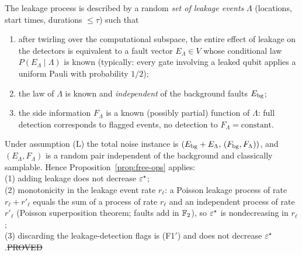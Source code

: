 \begin{definition}\label{def:L}
The leakage process is described by a random \emph{set of leakage events} $\Lambda$ (locations, start times, durations $\le\tau$) such that
\begin{enumerate}[(L1)]
\item after twirling over the computational subspace, the entire effect of leakage on the detectors is equivalent to a fault vector $E_\Lambda\in V$ whose conditional law
$P(E_\Lambda\mid\Lambda)$ is known (typically: every gate involving a leaked qubit applies a uniform Pauli with probability $1/2$);
\item the law of $\Lambda$ is known and \emph{independent} of the background faults $E_{\rm bg}$;
\item the side information $F_\Lambda$ is a known (possibly partial) function of $\Lambda$: full detection corresponds to flagged events, no detection to $F_\Lambda=\text{constant}$.
\end{enumerate}
\end{definition}

\begin{proposition}\label{prop:leak}
Under assumption (L) the total noise instance is $(E_{\rm bg}+E_\Lambda,\,(F_{\rm bg},F_\Lambda))$, and $(E_\Lambda,F_\Lambda)$ is a random pair independent of the background and
classically samplable. Hence Proposition~\ref{prop:free-ops} applies:\\
(1) adding leakage does not decrease $\varepsilon^{\star}$;\\
(2) monotonicity in the leakage event rate $r_\ell$: a Poisson leakage process of rate $r_\ell+r'_\ell$ equals the sum of a process of rate $r_\ell$ and an independent process of rate $r'_\ell$
(Poisson superposition theorem; faults add in $\mathbb{F}_2$), so $\varepsilon^{\star}$ is nondecreasing in $r_\ell$;\\
(3) discarding the leakage-detection flags is (F1$'$) and does not decrease $\varepsilon^{\star}$.\hfill\st{PROVED}
\end{proposition}

